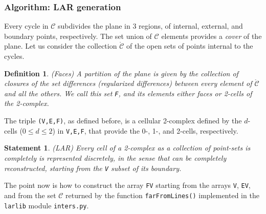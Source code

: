 \documentclass[11pt,oneside]{article}	%
\newtheorem{definition}{Definition}
\newtheorem{statement}{Statement}
\begin{document}
\subsubsection{Algorithm: LAR generation}
\label{sec:larFromCycles}

Every cycle in $\mathcal{C}$ subdivides the plane in 3 regions, of internal, external, and boundary points, respectively. The set union of $\mathcal{C}$ elements provides a \emph{cover} of the plane. Let us consider the collection $\mathring{\mathcal{C}}$ of the open sets of points internal to the cycles.

\begin{definition}{(Faces)}
A partition of the plane is given by the collection of closures of the set differences (\emph{regularized differences}) between every element of $\mathring{\mathcal{C}}$ and all the others. We call this set \texttt{F}, and its elements either \emph{faces} or 2-cells of the 2-complex.
\end{definition}

The triple \texttt{(V,E,F)}, as defined before, is a cellular 2-complex defined by the $d$-cells ($0\leq d\leq 2$) in \texttt{V,E,F}, that provide the 0-, 1-, and 2-cells, respectively. 

\begin{statement}{(LAR)}
Every cell of a 2-complex as a collection of point-sets is completely is represented discretely, in the sense that can be completely reconstructed, starting from the \texttt{V} subset of its boundary.
\end{statement}

The point now is how to construct the array \texttt{FV} starting from the arrays \texttt{V}, \texttt{EV}, and from the set $\mathcal{C}$ returned by the function \texttt{farFromLines()} implemented in the \texttt{larlib} module \texttt{inters.py}.
\end{document}

